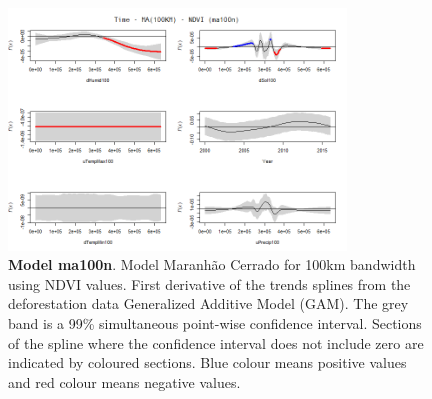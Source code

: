 \begin{table}
\begin{figure}[H]
 \centering
        \centering
        \includegraphics[width=0.8\textwidth]{ma100n.png} %
        \caption[Model Cerrado Maranhão for 100km bandwidth using NDVI values. First derivative of the trends splines from the deforestation data Generalized Additive Model (GAM)]{\textbf{Model ma100n}. Model Maranhão Cerrado for 100km bandwidth using NDVI values. First derivative of the trends splines from the deforestation data Generalized Additive Model (GAM). The grey band is a 99\% simultaneous point-wise confidence interval. Sections of the spline where the confidence interval does not include zero are indicated by coloured sections. Blue colour means positive values and red colour means negative values.}
\end{figure}

\end{table}

